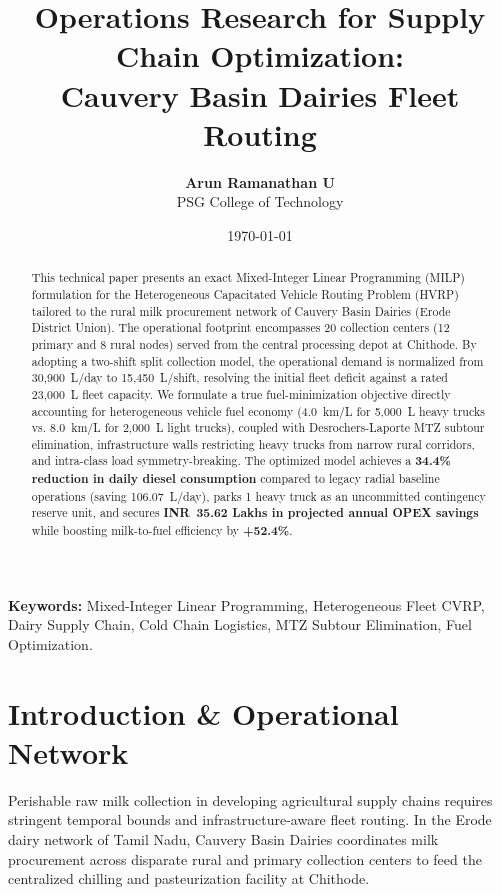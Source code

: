 \documentclass[11pt,a4paper]{article}
\title{\textbf{Operations Research for Supply Chain Optimization: \\ Cauvery Basin Dairies Fleet Routing}}
\author{\textbf{Arun Ramanathan U} \\ PSG College of Technology}
\date{\today}
\begin{document}
\maketitle

\begin{abstract}
This technical paper presents an exact Mixed-Integer Linear Programming (MILP) formulation for the Heterogeneous Capacitated Vehicle Routing Problem (HVRP) tailored to the rural milk procurement network of Cauvery Basin Dairies (Erode District Union). The operational footprint encompasses 20 collection centers (12 primary and 8 rural nodes) served from the central processing depot at Chithode. By adopting a two-shift split collection model, the operational demand is normalized from 30,900~L/day to 15,450~L/shift, resolving the initial fleet deficit against a rated 23,000~L fleet capacity. We formulate a true fuel-minimization objective directly accounting for heterogeneous vehicle fuel economy (4.0~km/L for 5,000~L heavy trucks vs. 8.0~km/L for 2,000~L light trucks), coupled with Desrochers-Laporte MTZ subtour elimination, infrastructure walls restricting heavy trucks from narrow rural corridors, and intra-class load symmetry-breaking. The optimized model achieves a \textbf{34.4\% reduction in daily diesel consumption} compared to legacy radial baseline operations (saving 106.07~L/day), parks 1 heavy truck as an uncommitted contingency reserve unit, and secures \textbf{INR~35.62 Lakhs in projected annual OPEX savings} while boosting milk-to-fuel efficiency by \textbf{+52.4\%}.
\end{abstract}

\vspace{0.5em}
\noindent\textbf{Keywords:} Mixed-Integer Linear Programming, Heterogeneous Fleet CVRP, Dairy Supply Chain, Cold Chain Logistics, MTZ Subtour Elimination, Fuel Optimization.

\section{Introduction \& Operational Network}

Perishable raw milk collection in developing agricultural supply chains requires stringent temporal bounds and infrastructure-aware fleet routing. In the Erode dairy network of Tamil Nadu, Cauvery Basin Dairies coordinates milk procurement across disparate rural and primary collection centers to feed the centralized chilling and pasteurization facility at Chithode.
\end{document}
